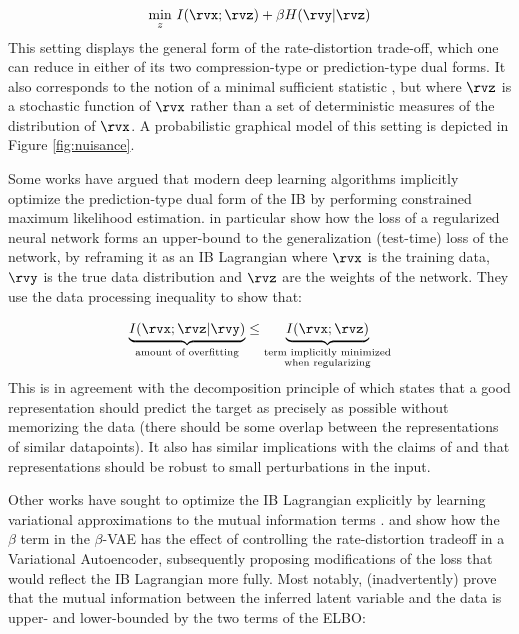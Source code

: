 \documentclass[withindex,glossary,firstyr,times]{cam-thesis}
\begin{document}
\begin{equation}
    \underset{z}{\min} ~ I(\rvx ; \rvz) + \beta H(\rvy | \rvz)
\end{equation}
This setting displays the general form of the rate-distortion trade-off, which one can reduce in either of its two compression-type or prediction-type dual forms. It also corresponds to the notion of a minimal sufficient statistic \cite{bahadur1954sufficiency}, but where $\rvz$ is a stochastic function of $\rvx$ rather than a set of deterministic measures of the distribution of $\rvx$. A probabilistic graphical model of this setting is depicted in Figure \ref{fig:nuisance}.

Some works \cite{tishby2015deep, shwartz2017opening, achille2018emergence} have argued that modern deep learning algorithms implicitly optimize the prediction-type dual form of the IB by performing constrained maximum likelihood estimation. \citet{achille2018emergence} in particular show how the loss of a regularized neural network forms an upper-bound to the generalization (test-time) loss of the network, by reframing it as an IB Lagrangian where $\rvx$ is the training data, $\rvy$ is the true data distribution and $\rvz$ are the weights of the network. They use the data processing inequality \cite{cover1999elements} to show that:

\begin{equation}
    \underbrace{I(\rvx; \rvz | \rvy)}_{\text{amount of overfitting}} \leq \underbrace{I(\rvx; \rvz)}_{\substack{\text{term implicitly minimized} \\ \text{when regularizing}}}
\end{equation}
This is in agreement with the decomposition principle of \citet{mathieu2019disentangling} which states that a good representation should predict the target as precisely as possible without memorizing the data (there should be some overlap between the representations of similar datapoints). It also has similar implications with the claims of \citet{bengio2013representation} and \citet{bruna2013invariant} that representations should be robust to small perturbations in the input.

Other works have sought to optimize the IB Lagrangian explicitly by learning variational approximations to the mutual information terms \cite{alemi2016deep}. \citet{burgess2018understanding} and \citet{alemi2018fixing} show how the $\beta$ term in the $\beta$-VAE \cite{higgins2016beta} has the effect of controlling the rate-distortion tradeoff in a Variational Autoencoder, subsequently proposing modifications of the loss that would reflect the IB Lagrangian more fully. Most notably, \citet{alemi2016deep} (inadvertently) prove that the mutual information between the inferred latent variable and the data is upper- and lower-bounded by the two terms of the ELBO:
\end{document}
